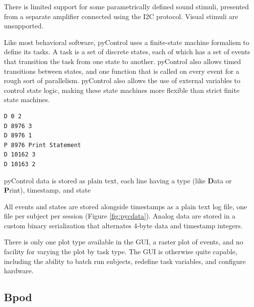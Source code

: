There is limited support for some parametrically defined sound stimuli, presented from a separate amplifier connected using the I2C protocol. Visual stimuli are unsupported.

Like most behavioral software, pyControl uses a finite-state machine formalism to define its tasks. A task is a set of discrete states, each of which has a set of events that transition the task from one state to another. pyControl also allows timed transitions between states, and one function that is called on every event for a rough sort of parallelism. pyControl also allows the use of external variables to control state logic, making these state machines more flexible than strict finite state machines.

\begin{marginfigure}[-3.5cm]
\begin{verbatim}
D 0 2
D 8976 3
D 8976 1
P 8976 Print Statement
D 10162 3
D 10163 2
\end{verbatim}
\caption{pyControl data is stored as plain text, each line having a type (like \textbf{D}ata or \textbf{P}rint), timestamp, and state}
\label{fig:pycdata}
\end{marginfigure}

All events and states are stored alongside timestamps as a plain text log file, one file per subject per session (Figure \ref{fig:pycdata}). Analog data are stored in a custom binary serialization that alternates 4-byte data and timestamp integers.

There is only one plot type available in the GUI, a raster plot of events, and no facility for varying the plot by task type. The GUI is otherwise quite capable, including the ability to batch run subjects, redefine task variables, and configure hardware.\\

\subsection{Bpod}

